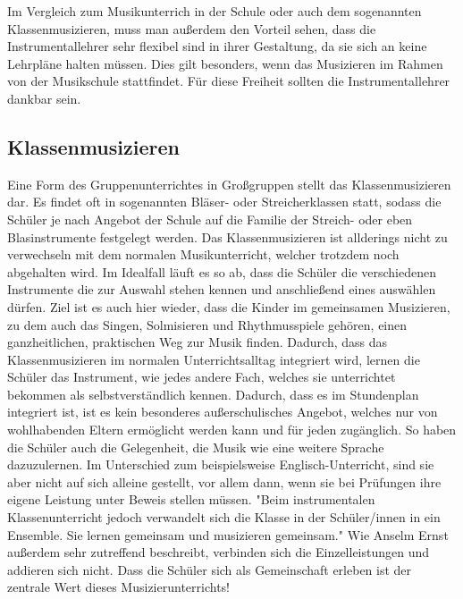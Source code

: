 Im Vergleich zum Musikunterrich in der Schule oder auch dem sogenannten
Klassenmusizieren, muss man außerdem den Vorteil sehen, dass die
Instrumentallehrer sehr flexibel sind in ihrer Gestaltung, da sie sich an keine
Lehrpläne halten müssen. Dies gilt besonders, wenn das Musizieren im Rahmen von
der Musikschule stattfindet. Für diese Freiheit sollten die Instrumentallehrer
dankbar sein.



\subsection{Klassenmusizieren}
Eine Form des Gruppenunterrichtes in Großgruppen stellt das Klassenmusizieren
dar. Es findet oft in sogenannten Bläser- oder Streicherklassen statt, sodass
die Schüler je nach Angebot der Schule auf die Familie der Streich- oder eben
Blasinstrumente festgelegt werden. Das Klassenmusizieren ist allderings nicht zu
verwechseln mit dem normalen Musikunterricht, welcher trotzdem noch abgehalten
wird. Im Idealfall läuft es so ab, dass die Schüler die verschiedenen
Instrumente die zur Auswahl stehen kennen und anschließend eines auswählen
dürfen. Ziel ist es auch hier wieder, dass die Kinder im gemeinsamen Musizieren,
zu dem auch das Singen, Solmisieren und Rhythmusspiele gehören, einen
ganzheitlichen, praktischen Weg zur Musik finden.
\autocite[91]{ernst:die_zukunftsfaehige_musikschule} Dadurch, dass das
Klassenmusizieren im normalen Unterrichtsalltag integriert wird, lernen die
Schüler das Instrument, wie jedes andere Fach, welches sie unterrichtet bekommen
als selbstverständlich kennen. Dadurch, dass es im Stundenplan integriert ist,
ist es kein besonderes außerschulisches Angebot, welches nur von wohlhabenden
Eltern ermöglicht werden kann und für jeden zugänglich. So haben die Schüler
auch die Gelegenheit, die Musik wie eine weitere Sprache dazuzulernen. Im
Unterschied zum beispielsweise Englisch-Unterricht, sind sie aber nicht auf sich
alleine gestellt, vor allem dann, wenn sie bei Prüfungen ihre eigene Leistung
unter Beweis stellen müssen. "Beim instrumentalen Klassenunterricht jedoch
verwandelt sich die Klasse in der Schüler/innen in ein Ensemble. Sie lernen
gemeinsam und musizieren gemeinsam."
\autocite[92]{ernst:die_zukunftsfaehige_musikschule} Wie Anselm Ernst außerdem
sehr zutreffend beschreibt, verbinden sich die Einzelleistungen und addieren
sich nicht. Dass die Schüler sich als Gemeinschaft erleben ist der zentrale Wert
dieses Musizierunterrichts!



